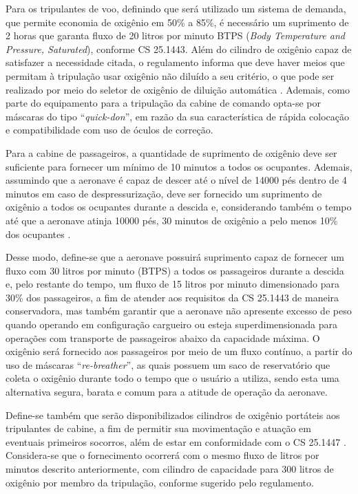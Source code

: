 Para os tripulantes de voo, definindo que será utilizado um sistema de demanda, que permite economia de oxigênio em 50\% a 85\%, é necessário um suprimento de 2 horas que garanta fluxo de 20 litros por minuto BTPS (\textit{Body Temperature and Pressure, Saturated}), conforme CS 25.1443. Além do cilindro de oxigênio capaz de satisfazer a necessidade citada, o regulamento informa que deve haver meios que permitam à tripulação usar oxigênio não diluído a seu critério, o que pode ser realizado por meio do seletor de oxigênio de diluição automática \cite{EASA25}. Ademais, como parte do equipamento para a tripulação da cabine de comando opta-se por máscaras do tipo “\textit{quick-don}”, em razão da sua característica de rápida colocação e compatibilidade com uso de óculos de correção.

Para a cabine de passageiros, a quantidade de suprimento de oxigênio deve ser suficiente para fornecer um mínimo de 10 minutos a todos os ocupantes. Ademais, assumindo que a aeronave é capaz de descer até o nível de 14000 pés dentro de 4 minutos em caso de despressurização, deve ser fornecido um suprimento de oxigênio a todos os ocupantes durante a descida e, considerando também o tempo até que a aeronave atinja 10000 pés, 30 minutos de oxigênio a pelo menos 10\% dos ocupantes \cite{EASA25}.

Desse modo, define-se que a aeronave possuirá suprimento capaz de fornecer um fluxo com 30 litros por minuto (BTPS) a todos os passageiros durante a descida e, pelo restante do tempo, um fluxo de 15 litros por minuto dimensionado para 30\% dos passageiros, a fim de atender aos requisitos da CS 25.1443 de maneira conservadora, mas também garantir que a aeronave não apresente excesso de peso quando operando em configuração cargueiro ou esteja superdimensionada para operações com transporte de passageiros abaixo da capacidade máxima. O oxigênio será fornecido aos passageiros por meio de um fluxo contínuo, a partir do uso de máscaras “\textit{re-breather}”, as quais possuem um saco de reservatório que coleta o oxigênio durante todo o tempo que o usuário a utiliza, sendo esta uma alternativa segura, barata e comum para a atitude de operação da aeronave.

Define-se também que serão disponibilizados cilindros de oxigênio portáteis aos tripulantes de cabine, a fim de permitir sua movimentação e atuação em eventuais primeiros socorros, além de estar em conformidade com o CS 25.1447 \cite{EASA25}. Considera-se que o fornecimento ocorrerá com o mesmo fluxo de litros por minutos descrito anteriormente, com cilindro de capacidade para 300 litros de oxigênio por membro da tripulação, conforme sugerido pelo regulamento.

